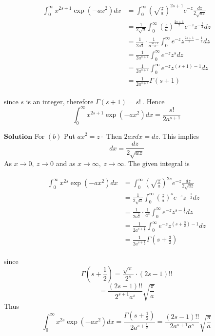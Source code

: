 $$\begin{aligned}
\int_{0}^{\infty} x^{2 s+1} \exp \left(-a x^{2}\right) d x &=\int_{0}^{\infty}\left(\sqrt{\frac{z}{a}}\right)^{2 s+1} e^{-z} \frac{d z}{2 \sqrt{a z}}\\
&=\frac{1}{2 \sqrt{a}} \int_{0}^{\infty}\left(\frac{z}{a}\right)^{\frac{2 s+1}{2}} e^{-z} z^{-\frac{1}{2}} d z \\
&=\frac{1}{2 a^{\frac{1}{2}}} \cdot \frac{1}{a^{\frac{2 s+1}{2}}} \int_{0}^{\infty} e^{-z} z^{\frac{2 s+1}{2}-\frac{1}{2}} d z \\
&=\frac{1}{2 a^{s+1}} \int_{0}^{\infty} e^{-z} z^{s} d z \\
&=\frac{1}{2 a^{s+1}} \int_{0}^{\infty} e^{-z} z^{(s+1)-1} d z \\
&=\frac{1}{2 a^{s+1}} \Gamma(s+1) \\
\end{aligned}
$$

since $s$ is an integer, therefore $\Gamma(s+1)=s! \ $. Hence 
$$\int_{0}^{\infty} x^{2 s+1} \exp \left(-a x^{2}\right) d x=\frac{s!}{2 a^{s+1}}$$ 

$\boxed{\textbf{Solution}}$ For $(b)$ Put $a x^{2}=z \cdot$ Then $2 a x d x=d z$. This implies
$$
d x=\frac{d z}{2 \sqrt{a z}}
$$
As $x \rightarrow 0, \  z \rightarrow 0$ and as $x \rightarrow \infty, \  z \rightarrow \infty$.
The given integral is

$$
\begin{aligned}
\int_{0}^{\infty} x^{2 s} \exp \left(-a x^{2}\right) d x &=\int_{0}^{\infty}\left(\sqrt{\frac{z}{a}}\right)^{2 s} e^{-z} \frac{d z}{2 \sqrt{a z}} \\
&=\frac{1}{2 \sqrt{a}} \int_{0}^{\infty}\left(\frac{z}{a}\right)^{s} e^{-z} z^{-\frac{1}{2}} d z \\
&=\frac{1}{2 a^{\frac{1}{2}}} \cdot \frac{1}{a^{s}} \int_{0}^{\infty} e^{-z} z^{s-\frac{1}{2}} d z \\
&=\frac{1}{2 a^{s+\frac{1}{2}}} \int_{0}^{\infty} e^{-z} z^{\left(s+\frac{3}{2}\right)-1} d z \\
&=\frac{1}{2 a^{s+\frac{1}{2}}} \Gamma\left(s+\frac{3}{2}\right) \\
\end{aligned}
$$

since 
$$\Gamma\left(s+\frac{1}{2}\right)=\frac{\sqrt{\pi}}{2^{s}} \cdot(2 s-1) ! !$$
$$
=\frac{(2 s-1) ! !}{2^{s+1} a^{s}} \sqrt{\frac{\pi}{a}}
$$
Thus
$$
\int_{0}^{\infty} x^{2 s} \exp \left(-a x^{2}\right) d x=\frac{\Gamma\left(s+\frac{1}{2}\right)}{2 a^{s+\frac{1}{2}}}=\frac{(2 s-1) ! !}{2 a^{s+1} a^{s}} \sqrt{\frac{\pi}{a}}
$$

